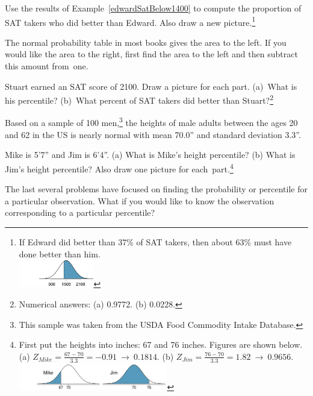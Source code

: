 \begin{exercise}
Use the results of Example~\ref{edwardSatBelow1400} to compute the proportion of SAT takers who did better than Edward. Also draw a new picture.\footnote{If Edward did better than 37\% of SAT takers, then about 63\% must have done better than him. \\
\includegraphics[height=12mm]{ch_distributions/figures/satBelow1400/satAbove1400}}
\end{exercise}

\begin{tipBox}{
The normal probability table in most books gives the area to the left. If you would like the area to the right, first find the area to the left and then subtract this amount from~one.}
\end{tipBox}

\begin{exercise}
Stuart earned an SAT score of 2100. Draw a picture for each part. (a)~What is his percentile? (b)~What percent of SAT takers did better than Stuart?\footnote{Numerical answers: (a) 0.9772. (b) 0.0228.}
\end{exercise}

Based on a sample of 100 men,\footnote{This sample was taken from the USDA Food Commodity Intake Database.} the heights of male adults between the ages 20 and 62 in the US is nearly normal with mean 70.0'' and standard deviation 3.3''.

\begin{exercise}
Mike is 5'7'' and Jim is 6'4''. (a) What is Mike's height percentile? (b) What is Jim's height percentile? Also draw one picture for each~part.\footnote{First put the heights into inches: 67 and 76 inches. Figures are shown below. (a) $Z_{Mike} = \frac{67 - 70}{3.3} = -0.91\ \to\ 0.1814$. (b) $Z_{Jim} = \frac{76 - 70}{3.3} = 1.82\ \to\ 0.9656$. \\\includegraphics[height=12mm]{ch_distributions/figures/mikeAndJimPercentiles/mikeAndJimPercentiles}}
\end{exercise}

The last several problems have focused on finding the probability or percentile for a particular observation. What if you would like to know the observation corresponding to a particular percentile?

